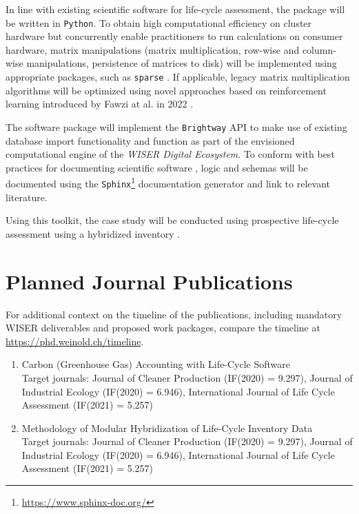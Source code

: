 \documentclass{article}
\begin{document}
    In line with existing scientific software for life-cycle assessment, the package will be written in \texttt{Python}. To obtain high computational efficiency on cluster hardware but concurrently enable practitioners to run calculations on consumer hardware, matrix manipulations (matrix multiplication, row-wise and column-wise manipulations, persistence of matrices to disk) will be implemented using appropriate packages, such as \texttt{sparse} \cite{abbasi_sparse_2018}. If applicable, legacy matrix multiplication algorithms will be optimized using novel approaches based on reinforcement learning introduced by Fawzi at al. in 2022 \cite{fawzi_discovering_2022}.
    
    The software package will implement the \texttt{Brightway} API to make use of existing database import functionality and function as part of the envisioned computational engine of the \textit{WISER Digital Ecosystem}. To conform with best practices for documenting scientific software \cite{lee_ten_2018}, logic and schemas will be documented using the \texttt{Sphinx}\footnote{\url{https://www.sphinx-doc.org/}} documentation generator and link to relevant literature.
    
    Using this toolkit, the case study will be conducted using prospective \cite{sacchi_prospective_2022} life-cycle assessment using a hybridized inventory \cite{crawford_hybrid_2018}.


\section{Planned Journal Publications}

    For additional context on the timeline of the publications, including mandatory WISER deliverables and proposed work packages, compare the timeline at \url{https://phd.weinold.ch/timeline}.
    
    \begin{enumerate}
    \setcounter{enumi}{0}
        \item Carbon (Greenhouse Gas) Accounting with Life-Cycle Software \\ Target journals: Journal of Cleaner Production (IF(2020) = 9.297), Journal of Industrial Ecology (IF(2020) = 6.946), International Journal of Life Cycle Assessment (IF(2021) = 5.257)
    \end{enumerate}
    
    \begin{enumerate}
    \setcounter{enumi}{1}
        \item Methodology of Modular Hybridization of Life-Cycle Inventory Data \\ Target journals: Journal of Cleaner Production (IF(2020) = 9.297), Journal of Industrial Ecology (IF(2020) = 6.946), International Journal of Life Cycle Assessment (IF(2021) = 5.257)
    \end{enumerate}
    
\end{document}
